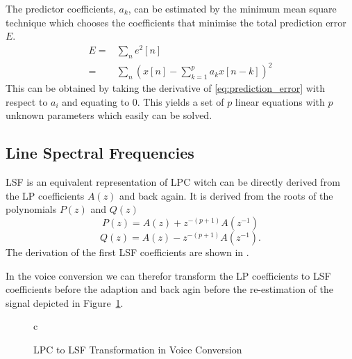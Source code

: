 The predictor coefficients, $a_k$, can be estimated by the minimum mean square technique which chooses the coefficients that minimise the total prediction error $E$.
\begin{equation}
	\label{eq:prediction_error}
	\begin{split}
		E = & \sum_{n}e^2[n]\\
		= & \sum_{n}\left( x[n]-\sum_{k=1}^{p}a_k x[n-k] \right)^2
	\end{split}
\end{equation}
This can be obtained by taking the derivative of \eqref{eq:prediction_error} with respect to $a_i$ and equating to $0$. This yields a set of $p$ linear equations with $p$ unknown parameters \cite{digsig} which easily can be solved.

\subsection{Line Spectral Frequencies} %
\label{sub:line_spectral_frequencies}
LSF is an equivalent representation of LPC witch can be directly derived from the LP coefficients $A(z)$ and back again. It is derived from the roots of the polynomials $P(z)$ and $Q(z)$ 
\begin{equation}
	\label{eq:p_z}
	P(z) = A(z)+z^{-(p+1)}A(z^{-1})
\end{equation}
\begin{equation}
	\label{eq:q_z}
	Q(z) = A(z)-z^{-(p+1)}A(z^{-1}).
\end{equation}
The derivation of the first LSF coefficients are shown in \cite[p. 304]{taletek}.

In the voice conversion we can therefor transform the LP coefficients to LSF coefficients before the adaption and back agin before the re-estimation of the signal depicted in Figure~\ref{fig:lpc_to_lsf}.
\begin{figure}[htbp]
	\centering
	\begin{tabular}[h]{c}
	\end{tabular}
	\caption{LPC to LSF Transformation in Voice Conversion}
	\label{fig:lpc_to_lsf}
\end{figure}

